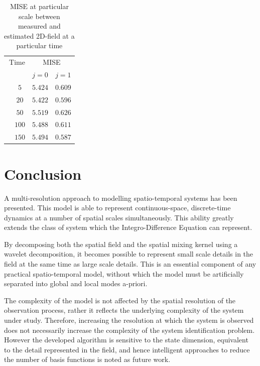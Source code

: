 \documentclass[11pt,draftcls,onecolumn,peerreview]{IEEEtran}
\begin{document}
{{\begin{table}[!h]
\renewcommand{\arraystretch}{1.3}
\caption {MISE  at particular scale between measured and estimated 2D-field  at a particular time}
\label{table:ValidationResultField}
\centering
\begin{tabular}{cccc}
\hline \hline
\multicolumn{2}{r}{Time}&\multicolumn{2}{c}{MISE} \\
\cline{3-4}
&&$j=0$&$j=1$ \\ 
\hline 
&$5$ &$5.424$&$0.609$ \\
&$20$ &$5.422$&$0.596$ \\
&$50$ &$5.519$&$0.626$ \\
&$100$ &$5.488$&$0.611$ \\
&$150$ &$5.494$&$0.587$ \\
\hline \hline
\end{tabular}
\end {table}
\section{Conclusion}
A multi-resolution approach to modelling spatio-temporal systems has been presented. This model is able to represent continuous-space, discrete-time dynamics at a number of spatial scales simultaneously. This ability greatly extends the class of system which the Integro-Difference Equation can represent.


By decomposing both the spatial field and the spatial mixing kernel using a wavelet decomposition, it becomes possible to represent small scale details in the field at the same time as large scale details. This is an essential component of any practical spatio-temporal model, without which the model must be artificially separated into global and local modes a-priori.


The complexity of the model is not affected by the spatial resolution of the observation process, rather it reflects the underlying complexity of the system under study. Therefore, increasing the resolution at which the system is observed does not necessarily increase the complexity of the system identification problem. However the developed algorithm is sensitive to the state dimension, equivalent to the detail represented in the field, and hence intelligent approaches to reduce the number of basis functions is noted as future work. 

}}
\end{document}
